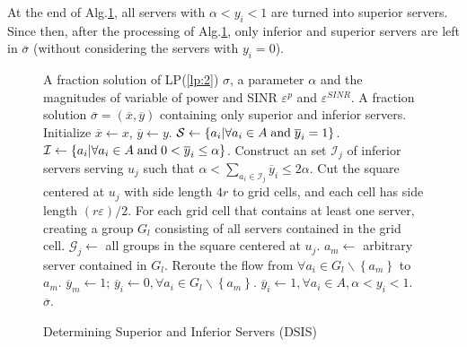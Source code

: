 \documentclass[journal]{IEEEtran}
\begin{document}
At the end of Alg.\ref{alg:DSIS}, all servers with $\alpha<y_i<1$ are turned into superior servers. Since then, after the processing of Alg.\ref{alg:DSIS}, only inferior and superior servers are left in $\overline{\sigma}$ (without considering the servers with $y_i=0$). 

\begin{figure}[!t]
	\renewcommand{\algorithmicrequire}{\textbf{Input:}}
	\renewcommand{\algorithmicensure}{\textbf{Output:}}
	\begin{algorithm}[H]
		\caption{Determining Superior and Inferior Servers (DSIS)}
		\begin{algorithmic}[1]\label{alg:DSIS}
			\REQUIRE A fraction solution of LP(\ref{lp:2}) $\sigma$, a parameter $\alpha$ and the magnitudes of variable of power and SINR ${\varepsilon ^p}$ and ${\varepsilon ^{SINR}}$.
			\ENSURE A fraction solution $\overline \sigma = ({\overline x},{\overline y})$ containing only superior and inferior servers.
			\STATE Initialize $\overline x \leftarrow x$, $\overline y \leftarrow y$.
			\STATE ${\mathcal{S}} \leftarrow \left\{ {{a_i}|\forall{a_i} \in A\; {\rm{and}} \; {{\overline y}_i} = 1} \right\}$.
			\STATE ${\mathcal{I}} \leftarrow \left\{ {{a_i}|\forall{a_i} \in A\; {\rm{and}} \; 0<{{\overline y}_i} \le \alpha} \right\}$.
			\STATE Construct an set $\mathcal{I}_j$ of inferior servers serving $u_j$  such that $\alpha < \sum\nolimits_{{a_i} \in \mathcal{I}_j} {{{\overline y }_i}}  \le 2\alpha $.
			\STATE Cut the square centered at $u_j$ with side length $4r$ to grid cells, and each cell has side length $(r\varepsilon)/2$.
			\STATE For each grid cell that contains at least one server, creating a group $G_l$ consisting of all servers contained in the grid cell.
			\STATE $\mathcal{G}_j \leftarrow$ all groups in the square centered at $u_j$.
			\STATE $a_m \leftarrow $ arbitrary server contained in $G_l$.
			\STATE Reroute the flow from $\forall a_i\in G_l\backslash\left\{a_m\right\}$ to $a_m$.
			\STATE $\overline{y}_m\leftarrow 1$; $\overline{y}_i \leftarrow 0, \forall a_i \in G_l\backslash\left\{a_m\right\}$.
			\ENDFOR
			\ENDIF
			\ENDFOR
			\STATE $\overline{y}_i \leftarrow 1, \forall a_i \in A, \alpha < y_i < 1$.
			\RETURN $\overline{\sigma}$.
		\end{algorithmic}
	\end{algorithm}
\end{figure}
\end{document}
